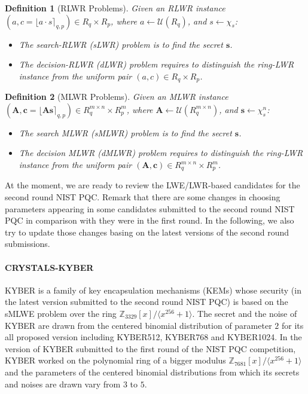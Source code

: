 \documentclass{cta-author}
\newtheorem{definition}{Definition}{}
\begin{document}
	 
	 
	 
	 
	 \begin{definition}[RLWR Problems] 
	 	Given an RLWR  instance   $(a,c=\lfloor a \cdot s \rceil_{q,p}) \in R_q \times R_p$, where $a \leftarrow \mathcal{U}(R_q)$, and $s\leftarrow \chi_s$:
	 	\begin{itemize}
	 		\item  The search-RLWR (sLWR) problem is to find the secret $\mathbf{s}$. 
	 		\item The decision-RLWR (dLWR) problem requires to distinguish the ring-LWR instance from the uniform pair $(a,c)\in  R_q \times  R_p$.
	 	\end{itemize}
	 \end{definition}
	 
	 
	 
	 \begin{definition}[MLWR Problems] 
	 	Given an MLWR  instance   $(\mathbf{A},\mathbf{c}=\lfloor \mathbf{A}\mathbf{s}  \rceil_{q,p}) \in R_q^{m \times n} \times R_p^m$, where $\mathbf{A} \leftarrow \mathcal{U}(R_q^{m \times n})$, and $\mathbf{s} \leftarrow \chi_s^n$:
	 	\begin{itemize}
	 		\item  The search MLWR (sMLWR) problem is to find the secret $\mathbf{s}$. 
	 		\item The decision MLWR (dMLWR) problem requires to distinguish the ring-LWR instance from the uniform pair $(\mathbf{A},\mathbf{c})\in  R_q^{m \times n} \times  R_p^m$.
	 	\end{itemize}
	 \end{definition}
 
	
 


 At the moment, we are ready to review the LWE/LWR-based candidates for the second round NIST PQC. Remark that there are some changes in choosing parameters appearing in some candidates submitted to the second round NIST PQC in comparison with they were in the first round. In the following, we also try to update those changes basing on the latest versions of the second round submissions.
 
\paragraph{CRYSTALS-KYBER \cite{ABDK+19}} 
KYBER is a family of key encapsulation mechanisms (KEMs) whose security (in the latest version submitted to the second round NIST PQC) is based on the sMLWE problem over the ring $\mathbb{Z}_{3329}[x]/ \langle x^{256}+1 \rangle$. The secret and the noise of KYBER are drawn from the centered binomial distribution of parameter $2$ for its all proposed version including KYBER512, KYBER768 and KYBER1024. In the version of KYBER submitted to the first round of the NIST PQC competition, KYBER worked on the polynomial ring of a bigger modulus $\mathbb{Z}_{7681}[x]/ \langle x^{256}+1 \rangle$ and  the parameters of the centered binomial distributions from which its secrets and noises are drawn vary from $3$ to $5$.
\end{document}
